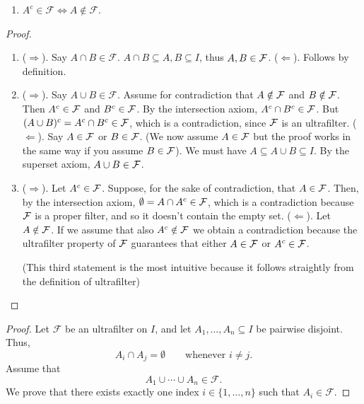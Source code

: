 {{\begin{enumerate}
    \item \(A^c \in \mathcal{F} \iff A \notin \mathcal{F}\).
\end{enumerate}
}
\begin{proof}
    \begin{enumerate}
        \item ($\Rightarrow$). Say $A \cap B \in \mathcal{F}$. $A \cap B \subseteq A, B \subseteq I$, thus $A, B \in \mathcal{F}$. 
        \newline
        \noin ($\Leftarrow$). Follows by definition. 
        \item ($\Rightarrow$). Say $A \cup B \in \mathcal{F}$. Assume for contradiction that $A \notin \mathcal{F}$ and $B \notin \mathcal{F}$. Then $A^c \in \mathcal{F}$ and $B^c \in \mathcal{F}$. By the intersection axiom, $A^c\cap B^c \in \mathcal{F}$. But $ (A\cup B)^c=A^c\cap B^c \in \mathcal{F}$, which is a contradiction, since $\mathcal{F}$ is an ultrafilter. 
        \newline
        \noin ($\Leftarrow$). Say $A \in \mathcal{F}$ or $B \in \mathcal{F}$. (We now assume $A \in \mathcal{F}$ but the proof works in the same way if you assume $B \in \mathcal{F}$). We must have $A \subseteq A \cup B \subseteq I$. By the superset axiom, $A \cup B \in \mathcal{F}$.
        \item ($\Rightarrow$). Let $A^c \in \mathcal{F}$. Suppose, for the sake of contradiction, that $A \in \mathcal{F}$. Then, by the intersection axiom, $\emptyset=A\cap A^c\in \mathcal{F}$, which is a contradiction because $\mathcal{F}$ is a proper filter, and so it doesn't contain the empty set.
        \newline
        \noin ($\Leftarrow$). Let $A \notin \mathcal{F}$. If we assume that also $A^c \notin \mathcal{F}$ we obtain a contradiction because the ultrafilter property of $\mathcal{F}$ guarantees that either $A \in \mathcal{F}$ or $A^c \in \mathcal{F}$. 

        (This third statement is the most intuitive because it follows straightly from the definition of ultrafilter)
    \end{enumerate}
\end{proof}

 \label{prop: in union of sets exactly one belongs to F}
\begin{proof}
Let $\mathcal{F}$ be an ultrafilter on $I$, and let
$A_1,\dots,A_n \subseteq I$ be pairwise disjoint. Thus,
\[
A_i \cap A_j = \emptyset
\qquad \text{whenever } i \neq j.
\]
Assume that
\[
A_1 \cup \cdots \cup A_n \in \mathcal{F}.
\]
We prove that there exists exactly one index
$i \in \{1,\dots,n\}$ such that $A_i \in \mathcal{F}$.


\end{proof}}
